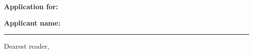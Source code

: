 \documentclass{letter}
\begin{document}
\noindent\textbf{Application for: \textit{ }}\par 
\vspace{5pt}
\noindent \textbf{Applicant name: } \par 
\vspace{5pt}

\hrule 
\vspace{5pt}

\noindent Dearest reader, \par 
\vspace{5pt}
\end{document}
